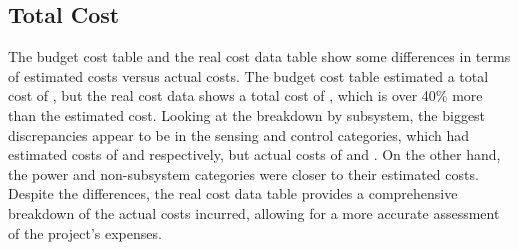 \subsection{Total Cost}
The budget cost table and the real cost data table show some differences in terms of estimated costs versus actual costs. The budget cost table estimated a total cost of , but the real cost data shows a total cost of , which is over 40\% more than the estimated cost. Looking at the breakdown by subsystem, the biggest discrepancies appear to be in the sensing and control categories, which had estimated costs of  and  respectively, but actual costs of  and . On the other hand, the power and non-subsystem categories were closer to their estimated costs. Despite the differences, the real cost data table provides a comprehensive breakdown of the actual costs incurred, allowing for a more accurate assessment of the project's expenses.
